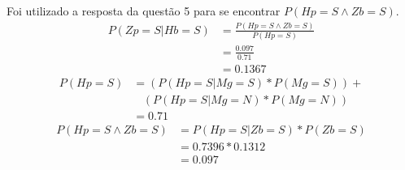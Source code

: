 \documentclass[answers]{exam}
\begin{document}
\begin{questions}
\question
\begin{solution}
Foi utilizado a resposta da questão 5 para se encontrar $P(Hp=S \land Zb=S)$.
\begin{align*}
P(Zp=S|Hb=S) &= \frac{P(Hp=S \land Zb=S)}{P(Hp=S)}\\
             &= \frac{0.097}{0.71}\\
             &= 0.1367
\end{align*}
\begin{align*}
P(Hp=S) &=(P(Hp=S|Mg=S)*P(Mg=S)) +\\
        &\ \ \ \ (P(Hp=S|Mg=N)*P(Mg=N))\\
        &= 0.71
\end{align*}
\begin{align*}
P(Hp=S \land Zb=S) &= P(Hp=S|Zb=S)*P(Zb=S)\\
                   &= 0.7396 * 0.1312\\
                   &= 0.097
\end{align*}
\end{solution}


\end{questions}
\end{document}
